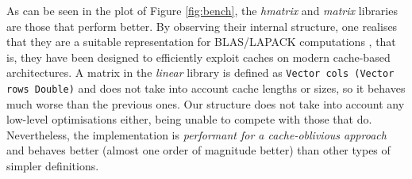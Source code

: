 \documentclass[sigplan,screen]{acmart}\settopmatter{}
\newcommand{\hs}{\texttt}
\begin{document}
As can be seen in the plot of Figure \ref{fig:bench}, the \emph{hmatrix} and \emph{matrix} libraries are those that perform better. By observing their internal structure, one realises that they are a suitable representation for BLAS/LAPACK computations \cite{anderson1999lapack}, that is, they have been designed to efficiently exploit caches on modern cache-based architectures. A matrix in the \emph{linear} library is defined as \hs{Vector cols (Vector rows Double)} and does not take into account cache lengths or sizes, so it behaves much worse than the previous ones. Our structure does not take into account any low-level optimisations either, being unable to compete with those that do. Nevertheless, the implementation is \emph{performant for a cache-oblivious approach} and behaves better (almost one order of magnitude better) than other types of simpler definitions.


%
\end{document}
